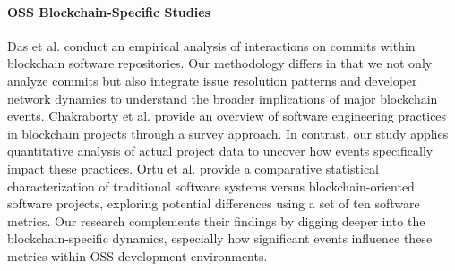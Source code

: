 \paragraph{OSS Blockchain-Specific Studies}
Das et al. \cite{Das2022211} conduct an empirical analysis of interactions on commits within blockchain software repositories. Our methodology differs in that we not only analyze commits but also integrate issue resolution patterns and developer network dynamics to understand the broader implications of major blockchain events. Chakraborty et al. \cite{Chakraborty2018} provide an overview of software engineering practices in blockchain projects through a survey approach. In contrast, our study applies quantitative analysis of actual project data to uncover how events specifically impact these practices.
Ortu et al. \cite{Ortu201932} provide a comparative statistical characterization of traditional software systems versus blockchain-oriented software projects, exploring potential differences using a set of ten software metrics. Our research complements their findings by digging deeper into the blockchain-specific dynamics, especially how significant events influence these metrics within OSS development environments. 

